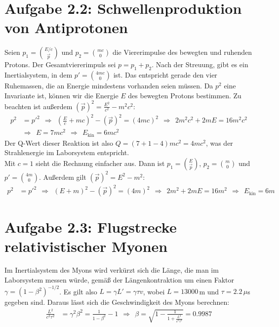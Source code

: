 \documentclass[a4paper,12pt]{article}
\newcommand{\kla}{}
\newcommand{\tecxt}{}
\begin{document}
\section*{Aufgabe 2.2: Schwellenproduktion von Antiprotonen}
Seien $p_1=\binom{E/c}{\vec{p}}$ und $p_2=\binom{mc}{0}$ die Viererimpulse des bewegten und ruhenden Protons. Der Gesamtviererimpuls sei $p=p_1+p_2$. Nach der Streuung, gibt es ein Inertialsystem, in dem $p'=\binom{4mc}{0}$ ist. Das entspricht gerade den vier Ruhemassen, die an Energie mindestens vorhanden seien müssen. Da $p^2$ eine Invariante ist, können wir die Energie $E$ des bewegten Protons bestimmen. Zu beachten ist außerdem $(\vec{p})^2=\frac{E^2}{c^2}-m^2c^2$:
\begin{align*}
p^2&=p'^2\ \ \Rightarrow\ \ \kla\left( {\frac{E}{c}+mc} \right)^2-(\vec{p})^2=(4mc)^2\ \ \Rightarrow\ \ 2m^2c^2+2mE=16m^2c^2\\
&\Rightarrow\ \ E=7mc^2\ \ \Rightarrow\ \ E_\tecxt\text{kin}=6mc^2
\end{align*}
Der Q-Wert dieser Reaktion ist also $Q=(7+1-4)mc^2=4mc^2$, was der Strahlenergie im Laborsystem entspricht.\\
Mit $c=1$ sieht die Rechnung einfacher aus. Dann ist $p_1=\binom{E}{\vec{p}}$, $p_2=\binom{m}{0}$ und $p'=\binom{4m}{0}$. Außerdem gilt $(\vec{p})^2=E^2-m^2$:
\begin{align*}
p^2&=p'^2\ \ \Rightarrow\ \ (E+m)^2-(\vec{p})^2=(4m)^2\ \ \Rightarrow\ \ 2m^2+2mE=16m^2\ \ \Rightarrow\ \ E_\tecxt\text{kin}=6m
\end{align*}
\section*{Aufgabe 2.3: Flugstrecke relativistischer Myonen}
Im Inertialsystem des Myons wird verkürzt sich die Länge, die man im Laborsystem messen würde, gemäß der Längenkontraktion um einen Faktor $\gamma=(1-\beta^2)^{-1/2}$. Es gilt also $L=\gamma L'=\gamma\tau v$, wobei $L=13000$\,m und $\tau=2.2\,\mu$s gegeben sind. Daraus lässt sich die Geschwindigkeit des Myons berechnen:
\begin{align*}
\frac{L^2}{c^2\tau^2}&=\gamma^2\beta^2=\frac{1}{1-\beta^2}-1\ \ \Rightarrow\ \ \beta=\sqrt{1-\frac{1}{1+\frac{L^2}{c^2\tau^2}}}=0.9987
\end{align*}
\end{document}
